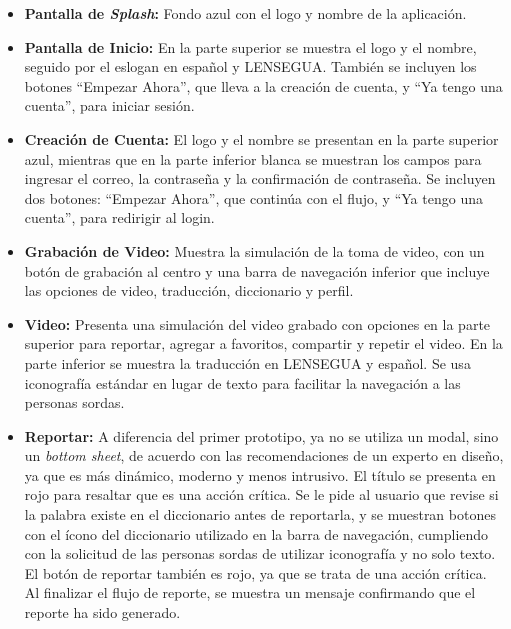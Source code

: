 \begin{itemize}
    \item \textbf{Pantalla de \textit{Splash}:} Fondo azul con el logo y nombre de la aplicación.
  
    \item \textbf{Pantalla de Inicio:} En la parte superior se muestra el logo y el nombre, seguido por el eslogan en español y LENSEGUA. También se incluyen los botones ``Empezar Ahora'', que lleva a la creación de cuenta, y ``Ya tengo una cuenta'', para iniciar sesión.
  
    \item \textbf{Creación de Cuenta:} El logo y el nombre se presentan en la parte superior azul, mientras que en la parte inferior blanca se muestran los campos para ingresar el correo, la contraseña y la confirmación de contraseña. Se incluyen dos botones: ``Empezar Ahora'', que continúa con el flujo, y ``Ya tengo una cuenta'', para redirigir al login.
  
    \item \textbf{Grabación de Video:} Muestra la simulación de la toma de video, con un botón de grabación al centro y una barra de navegación inferior que incluye las opciones de video, traducción, diccionario y perfil.

    \item \textbf{Video:} Presenta una simulación del video grabado con opciones en la parte superior para reportar, agregar a favoritos, compartir y repetir el video. En la parte inferior se muestra la traducción en LENSEGUA y español. Se usa iconografía estándar en lugar de texto para facilitar la navegación a las personas sordas.

    \item \textbf{Reportar:} A diferencia del primer prototipo, ya no se utiliza un modal, sino un \textit{bottom sheet}, de acuerdo con las recomendaciones de un experto en diseño, ya que es más dinámico, moderno y menos intrusivo. El título se presenta en rojo para resaltar que es una acción crítica. Se le pide al usuario que revise si la palabra existe en el diccionario antes de reportarla, y se muestran botones con el ícono del diccionario utilizado en la barra de navegación, cumpliendo con la solicitud de las personas sordas de utilizar iconografía y no solo texto. El botón de reportar también es rojo, ya que se trata de una acción crítica. Al finalizar el flujo de reporte, se muestra un mensaje confirmando que el reporte ha sido generado.


\end{itemize}
